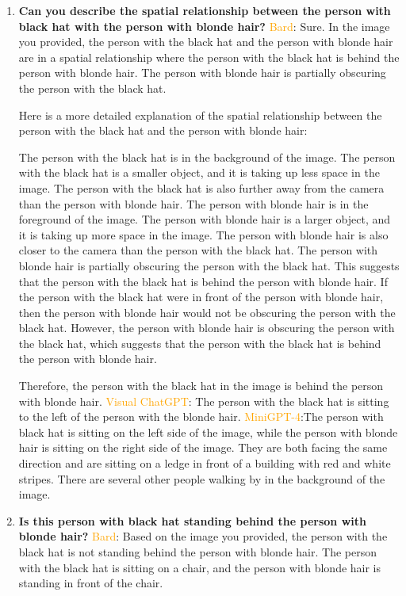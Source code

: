 \begin{enumerate}
    \item \textbf{Can you describe the spatial relationship between the person with black hat with the person with blonde hair?}
    \subitem \textcolor{orange}{Bard}: 
    Sure. In the image you provided, the person with the black hat and the person with blonde hair are in a spatial relationship where the person with the black hat is behind the person with blonde hair. The person with blonde hair is partially obscuring the person with the black hat.
    
    Here is a more detailed explanation of the spatial relationship between the person with the black hat and the person with blonde hair:
    
    The person with the black hat is in the background of the image. The person with the black hat is a smaller object, and it is taking up less space in the image. The person with the black hat is also further away from the camera than the person with blonde hair.
    The person with blonde hair is in the foreground of the image. The person with blonde hair is a larger object, and it is taking up more space in the image. The person with blonde hair is also closer to the camera than the person with the black hat.
    The person with blonde hair is partially obscuring the person with the black hat. This suggests that the person with the black hat is behind the person with blonde hair.
    If the person with the black hat were in front of the person with blonde hair, then the person with blonde hair would not be obscuring the person with the black hat. However, the person with blonde hair is obscuring the person with the black hat, which suggests that the person with the black hat is behind the person with blonde hair.
    
    Therefore, the person with the black hat in the image is behind the person with blonde hair.     
    \subitem \textcolor{orange}{Visual ChatGPT}: The person with the black hat is sitting to the left of the person with the blonde hair.
    \subitem \textcolor{orange}{MiniGPT-4}:The person with black hat is sitting on the left side of the image, while the person with blonde hair is sitting on the right side of the image. They are both facing the same direction and are sitting on a ledge in front of a building with red and white stripes. There are several other people walking by in the background of the image. 
    \item \textbf{Is this person with black hat standing behind the person with blonde hair?}
    \subitem \textcolor{orange}{Bard}: 
    Based on the image you provided, the person with the black hat is not standing behind the person with blonde hair. The person with the black hat is sitting on a chair, and the person with blonde hair is standing in front of the chair.
    

\end{enumerate}
